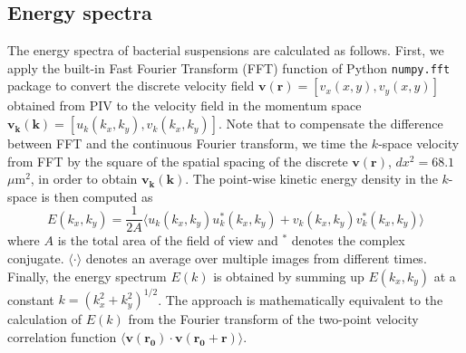 \documentclass[9pt,twoside,lineno]{pnas-new}
\begin{document}
\subsection{Energy spectra} \label{appendix-IA-ES}
The energy spectra of bacterial suspensions are calculated as follows. First, we apply the built-in Fast Fourier Transform (FFT) function of Python \texttt{numpy.fft} package to convert the discrete velocity field $\bm{v}(\bm{r}) = [v_x(x,y), v_y(x,y)]$ obtained from PIV to the velocity field in the momentum space $\bm{v_k}(\bm{k}) = [u_k(k_x,k_y),v_k(k_x,k_y)]$. Note that to compensate the difference between FFT and the continuous Fourier transform, we time the $k$-space velocity from FFT by the square of the spatial spacing of the discrete $\bm{v}(\bm{r})$, $dx^2 = 68.1$ $\mu$m$^2$, in order to obtain $\bm{v_k}(\bm{k})$. The point-wise kinetic energy density in the $k$-space is then computed as
\begin{equation}
	E(k_x, k_y) = 
	\frac{1}{2A}\langle u_k(k_x, k_y)u^*_k(k_x, k_y)+v_k(k_x, k_y)v_k^*(k_x, k_y)\rangle
\end{equation}
where $A$ is the total area of the field of view and $^*$ denotes the complex conjugate. $\langle\cdot\rangle$ denotes an average over multiple images from different times. Finally, the energy spectrum $E(k)$ is obtained by summing up $E(k_x,k_y)$ at a constant $k=(k_x^2+k_y^2)^{1/2}$. The approach is mathematically equivalent to the calculation of $E(k)$ from the Fourier transform of the two-point velocity correlation function $\langle \bm{v}(\bm{r_0}) \cdot \bm{v}(\bm{r_0}+\bm{r}) \rangle$. 
\end{document}
